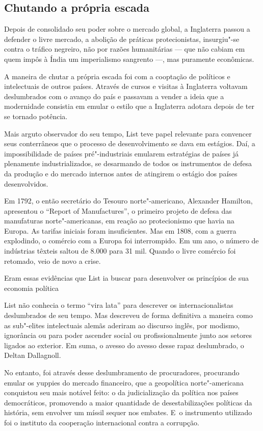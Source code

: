 \subsection{Chutando a própria escada}

Depois de consolidado seu poder sobre o mercado global, a Inglaterra
passou a defender o livre mercado, a abolição de práticas
protecionistas, insurgiu"-se contra o tráfico negreiro, não por razões
humanitárias --- que não cabiam em quem impôs à Índia um imperialismo
sangrento \mbox{---,} mas puramente econômicas.

A maneira de chutar a própria escada foi com a cooptação de políticos e
intelectuais de outros países. Através de cursos e visitas à Inglaterra
voltavam deslumbrados com o avanço do país e passavam a vender a ideia
que a modernidade consistia em emular o estilo que a Inglaterra adotara
depois de ter se tornado potência.

Mais arguto observador do seu tempo, List teve papel relevante para
convencer seus conterrâneos que o processo de desenvolvimento se dava em
estágios. Daí, a impossibilidade de países pré"-industriais emularem
estratégias de países já plenamente industrializados, se desarmando de
todos os instrumentos de defesa da produção e do mercado internos antes
de atingirem o estágio dos países desenvolvidos.

Em 1792, o então secretário do Tesouro norte"-americano, Alexander
Hamilton, apresentou o ``Report of Manufactures'', o primeiro projeto de
defesa das manufaturas norte"-americanas, em reação ao protecionismo que
havia na Europa. As tarifas iniciais foram insuficientes. Mas em 1808,
com a guerra explodindo, o comércio com a Europa foi interrompido. Em um
ano, o número de indústrias têxteis saltou de 8.000 para 31 mil. Quando
o livre comércio foi retomado, veio de novo a crise.

Eram essas evidências que List ia buscar para desenvolver os princípios
de sua economia política

List não conhecia o termo ``vira lata'' para descrever os
internacionalistas deslumbrados de seu tempo. Mas descreveu de forma
definitiva a maneira como as sub"-elites intelectuais alemãs aderiram ao
discurso inglês, por modismo, ignorância ou para poder ascender social
ou profissionalmente junto aos setores ligados ao exterior. Em suma, o
avesso do avesso desse rapaz deslumbrado, o Deltan Dallagnoll.

 No entanto, foi através desse deslumbramento de procuradores,
procurando emular os yuppies do mercado financeiro, que a geopolítica
norte"-americana conquistou seu mais notável feito: o da judicialização
da política nos países democráticos, promovendo a maior quantidade de
desestabilizações políticas da história, sem envolver um míssil sequer
nos embates. E~o instrumento utilizado foi o instituto da cooperação
internacional contra a corrupção.


